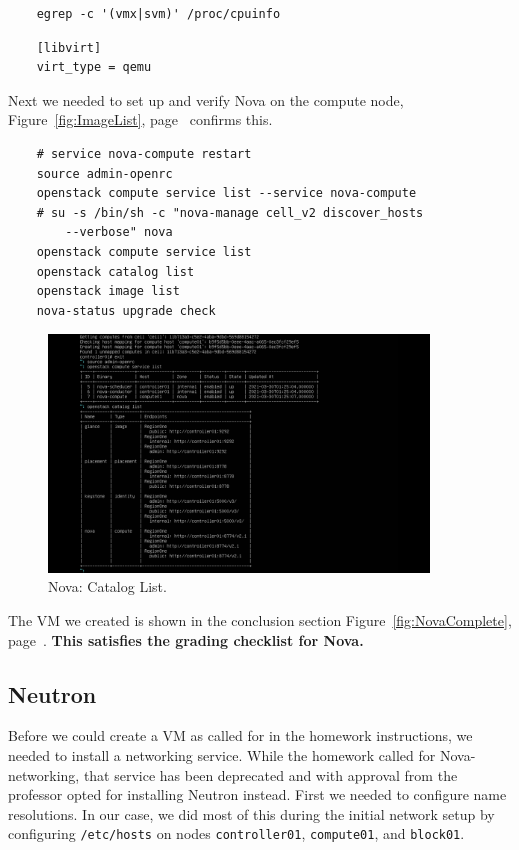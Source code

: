 \documentclass{article}
\begin{document}
\begin{verbatim}
    egrep -c '(vmx|svm)' /proc/cpuinfo
\end{verbatim}

\begin{verbatim}
    [libvirt]
    virt_type = qemu
\end{verbatim}

Next we needed to set up and verify Nova on the compute node, Figure~\ref{fig:ImageList}, page~\pageref{fig:ImageList} confirms this.

\begin{verbatim}
    # service nova-compute restart
    source admin-openrc
    openstack compute service list --service nova-compute
    # su -s /bin/sh -c "nova-manage cell_v2 discover_hosts 
        --verbose" nova
    openstack compute service list
    openstack catalog list
    openstack image list
    nova-status upgrade check
\end{verbatim}

\begin{figure}[ht]
    \centering
    \includegraphics[width=0.9\textwidth]{NovaCatalog.png}
    \caption{Nova: Catalog List.}
    \label{fig:NovaCatalog}
\end{figure}

The VM we created is shown in the conclusion section Figure~\ref{fig:NovaComplete}, page~\pageref{fig:HorizonComplete}. \textbf{This satisfies the grading checklist for Nova.}






\subsection{Neutron}
Before we could create a VM as called for in the homework instructions, we needed to install a networking service. While the homework called for Nova-networking, that service has been deprecated and with approval from the professor opted for installing Neutron instead. First we needed to configure name resolutions. In our case, we did most of this during the initial network setup by configuring \texttt{/etc/hosts} on nodes \texttt{controller01}, \texttt{compute01}, and \texttt{block01}.
\end{document}
